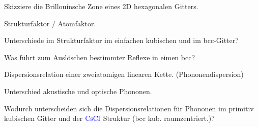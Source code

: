 \documentclass[a5paper,12pt,ngerman,print,grid=front]{kartei}
\let\oldce\ce
\renewcommand*{\ce}[1]{\begingroup\color{blue}\oldce{#1}\endgroup}
\begin{document}
	\begin{karte}{
		Skizziere die Brillouinsche Zone eines 2D hexagonalen Gitters.
		}
		
		
		
	\end{karte}


	\begin{karte}{
		Strukturfaktor / Atomfaktor.
		}
		
		
		
	\end{karte}


	\begin{karte}{
		Unterschiede im Strukturfaktor im einfachen kubischen und im bcc-Gitter?
		}
		
		
		
	\end{karte}


	\begin{karte}{
		Was führt zum Auslöschen bestimmter Reflexe in eimen bcc?
		}
		
		
		
	\end{karte}


	\begin{karte}{
		Dispersionsrelation einer zweiatomigen linearen Kette. (Phononendispersion)
		}
		
		
		
	\end{karte}


	\begin{karte}{
		Unterschied akustische und optische Phononen.
		}
		
		
		
	\end{karte}


	\begin{karte}{
		Wodurch unterscheiden sich die Dispersionsrelationen für Phononen im primitiv 
		kubischen Gitter und der $\ce{CsCl}$ Struktur (bcc kub. raumzentriert.)?
		}
		
		
		
	\end{karte}
\end{document}
